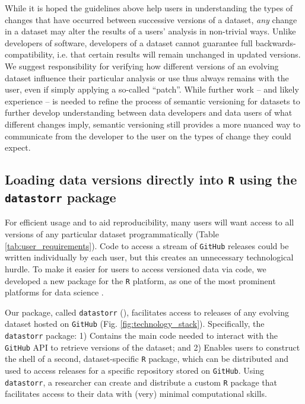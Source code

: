 \documentclass[a4paper,num-refs]{assets/oup-contemporary}
\begin{document}
While it is hoped the guidelines above help users in understanding the types of changes that have occurred between successive versions of a dataset, \emph{any} change in a dataset may alter the results of a users' analysis in non-trivial ways. Unlike developers of software, developers of a dataset cannot guarantee full backwards-compatibility, i.e. that certain results will remain unchanged in updated versions. We suggest responsibility for verifying how different versions of an evolving dataset influence their particular analysis or use thus always remains with the user, even if simply applying a so-called ``patch''. While further work -- and likely experience -- is needed to refine the process of semantic versioning for datasets to further develop understanding between data developers and data users of what different changes imply, semantic versioning still provides a more nuanced way to communicate from the developer to the user on the types of change they could expect.

\subsection{Loading data versions directly into \texttt{R} using the \texttt{datastorr} package}

For efficient usage and to aid reproducibility, many users will want access to all versions of any particular dataset programmatically (Table \ref{tab:user_requirements}). Code to access a stream of \texttt{GitHub} releases could be written individually by each user, but this creates an unnecessary technological hurdle. To make it easier for users to access versioned data via code, we developed a new package for the \texttt{R} platform, as one of the most prominent platforms for data science \cite{R-2017}.

Our package, called \texttt{datastorr} (), facilitates access to releases of any evolving dataset hosted on \texttt{GitHub} (Fig. \ref{fig:technology_stack}). Specifically, the \texttt{datastorr} package: 1) Contains the main code needed to interact with the \texttt{GitHub} API to retrieve versions of the dataset; and 2) Enables users to construct the shell of a second, dataset-specific \texttt{R} package, which can be distributed and used to access releases for a specific repository stored on \texttt{GitHub}. Using \texttt{datastorr}, a researcher can create and distribute a custom \texttt{R} package that facilitates access to their data with (very) minimal computational skills.
\end{document}
